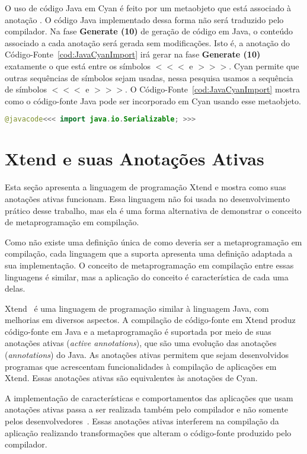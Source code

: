O uso de código Java em Cyan é feito por um metaobjeto que está associado à anotação . O código Java implementado dessa forma não será traduzido pelo compilador. Na fase \textbf{Generate (10)} de geração de código em Java, o conteúdo associado a cada anotação será gerada sem modificações. Isto é, a anotação do Código-Fonte~\ref{cod:JavaCyanImport} irá gerar na fase \textbf{Generate (10)} exatamente o que está entre os símbolos \textbf{$<<<$} e \textbf{$>>>$}. Cyan permite que outras sequências de símbolos sejam usadas, nessa pesquisa usamos a sequência de símbolos \textbf{$<<<$} e \textbf{$>>>$}. O Código-Fonte~\ref{cod:JavaCyanImport} mostra como o código-fonte Java pode ser incorporado em Cyan usando esse metaobjeto.

\begin{lstlisting}[language=Java, caption={Uso de Código Java em Cyan}, label={cod:JavaCyanImport},float]
@javacode<<< import java.io.Serializable; >>>
\end{lstlisting}

\section{Xtend e suas Anotações Ativas}
\label{sec:xtendanot}

Esta seção apresenta a linguagem de programação Xtend e mostra como suas anotações ativas funcionam. Essa linguagem não foi usada no desenvolvimento prático desse trabalho, mas ela é uma forma alternativa de demonstrar o conceito de metaprogramação em compilação.

Como não existe uma definição única de como deveria ser a metaprogramação em compilação, cada linguagem que a suporta apresenta uma definição adaptada a sua implementação. O conceito de metaprogramação em compilação entre essas linguagens é similar, mas a aplicação do conceito é característica de cada uma delas.

Xtend~\cite{rentschler2014designing} é uma linguagem de programação similar à linguagem Java, com melhorias em diversos aspectos. A compilação de código-fonte em Xtend produz código-fonte em Java e a metaprogramação é suportada por meio de suas anotações ativas (\textit{active annotations}), que são uma evolução das anotações (\textit{annotations}) do Java. As anotações ativas permitem que sejam desenvolvidos programas que acrescentam funcionalidades à compilação de aplicações em Xtend. Essas anotações ativas são equivalentes às anotações de Cyan.

A implementação de características e comportamentos das aplicações que usam anotações ativas passa a ser realizada também pelo compilador e não somente pelos desenvolvedores~\cite{rentschler2014designing}. Essas anotações ativas interferem na compilação da aplicação realizando transformações que alteram o código-fonte produzido pelo compilador.

